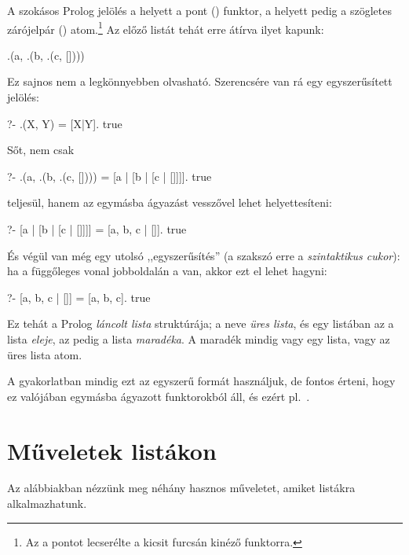 A szokásos Prolog jelölés a  helyett a
pont () funktor, a  helyett pedig a
szögletes zárójelpár (\pr{[]}) atom.\footnote{Az
 a pontot lecserélte a kicsit
furcsán kinéző  funktorra.}
Az előző listát tehát erre átírva ilyet kapunk:
\index{\pr{[]}}
\begin{query}
.(a, .(b, .(c, [])))
\end{query}
Ez sajnos nem a legkönnyebben olvasható. Szerencsére
van rá egy egyszerűsített jelölés:
\begin{query}
?- .(X, Y) = [X|Y].
true
\end{query}
Sőt, nem csak
\begin{query}
?- .(a, .(b, .(c, []))) = [a | [b | [c | []]]].
true
\end{query}
teljesül, hanem az egymásba ágyazást vesszővel lehet
helyettesíteni:
\begin{query}
?- [a | [b | [c | []]]] = [a, b, c | []].
true
\end{query}
És végül van még egy utolsó ,,egyszerűsítés'' (a
szakszó erre a \emph{szintaktikus cukor}): ha a
függőleges vonal jobboldalán a \pr{[]} van, akkor
ezt el lehet hagyni:
\begin{query}
?- [a, b, c | []] = [a, b, c].
true
\end{query}
Ez tehát a Prolog \emph{láncolt lista} struktúrája;
a \pr{[]} neve \emph{üres lista}, és egy \pr{[X|Y]}
listában az  a lista \emph{eleje}, az 
pedig a lista \emph{maradéka}. A maradék mindig vagy
egy lista, vagy az üres lista atom.

A gyakorlatban mindig ezt az egyszerű formát
használjuk, de fontos érteni, hogy ez valójában
egymásba ágyazott funktorokból áll, és ezért
pl.~\pr{[a, b, c] = [a | [b, c]] = [a, b | [c]] =
  [a, b, c | []]}.

\section{Műveletek listákon}

Az alábbiakban nézzünk meg néhány hasznos műveletet,
amiket listákra alkalmazhatunk.

